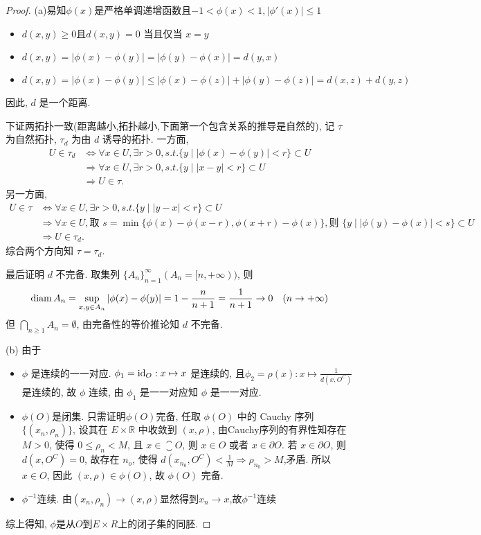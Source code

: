 \begin{proof}
    (a)易知$\phi (x)$是严格单调递增函数且$-1<\phi(x)<1,|\phi '(x)|\leq 1$
    \begin{itemize}
    \item $d(x,y)\geq 0$且$d(x,y)=0$ 当且仅当 $x=y$
    \item $d(x,y)=|\phi(x)-\phi(y)|=|\phi(y)-\phi(x)|=d(y,x)$
    \item $d(x,y)=|\phi(x)-\phi(y)|\leq |\phi(x)-\phi(z)|+|\phi(y)-\phi(z)|=d(x,z)+d(y,z)$
    \end{itemize}
    因此, $d$ 是一个距离.

    下证两拓扑一致(距离越小,拓扑越小,下面第一个包含关系的推导是自然的), 
    记 $\tau$ 为自然拓扑, $\tau_d$ 为由 $d$ 诱导的拓扑. 一方面,
    \begin{align*}
        U\in\tau_d
        & \Leftrightarrow\forall x\in U,\exists r>0,s.t.\{y\mid|\phi(x)-\phi(y)|<r\}\subset U\\
        & \Rightarrow\forall x\in U,\exists r>0,s.t.\{y\mid|x-y|<r\}\subset U\\
        & \Rightarrow U\in\tau.
    \end{align*}
    另一方面,
    \begin{align*}
    U\in\tau
    & \Leftrightarrow\forall x\in U,\exists r>0,s.t.\{y\mid |y-x|<r\}\subset U\\
    & \Rightarrow\forall x\in U,\text{取\ }s=\min\{\phi(x)-\phi(x-r),\phi(x+r)-\phi(x)\},\text{则\ }\{y\mid |\phi(y)-\phi(x)|<s\}\subset U\\
    & \Rightarrow U\in\tau_d.
    \end{align*}
    综合两个方向知 $\tau=\tau_d$.

    最后证明 $d$ 不完备. 取集列 $\{A_n\}_{n=1}^{\infty}(A_n=[n,+\infty))$, 则
    \[\operatorname{diam} A_n=\sup_{x,y\in A_n}|\phi(x)-\phi(y)|=1-\frac{n}{n+1}=\frac{1}{n+1}\to 0\quad(n\to +\infty)\]
    但 $\bigcap\limits_{n\geq 1}A_n=\emptyset$, 由完备性的等价推论知 $d$ 不完备.

    (b) 由于
    \begin{itemize}
    \item $\phi$ 是连续的一一对应. $\phi_1=\mathrm{id}_O:x\mapsto x$ 是连续的, 且$\phi_2=\rho(x):x\mapsto\frac{1}{d(x,O^C)}$是连续的,
          故 $\phi$ 连续, 由 $\phi_1$ 是一一对应知 $\phi$ 是一一对应.
    \item $\phi(O)$是闭集. 只需证明$\phi(O)$完备,
          任取 $\phi(O)$ 中的 Cauchy 序列 $\{(x_n,\rho_n)\}$,
          设其在 $E\times\mathbb{R}$ 中收敛到 $(x,\rho)$,
          由Cauchy序列的有界性知存在 $M>0$, 使得 $0\leq\rho_n<M$, 且 $x\in\closure{O}$, 则 $x\in O$ 或者 $x\in\partial O$.
          若 $x\in\partial O$, 则 $d(x,O^C)=0$, 故存在 $n_o$, 使得 $d(x_{n_0},O^C)<\frac{1}{M}\Rightarrow\rho_{n_0}>M$,矛盾.
          所以 $x\in O$, 因此 $(x,\rho)\in\phi(O)$, 故 $\phi(O)$ 完备.
    \item $\phi^{-1}$连续. 由$(x_n,\rho_n)\rightarrow (x,\rho)$显然得到$x_n\rightarrow x$,故$\phi^{-1}$连续
    \end{itemize}
    综上得知, $\phi$是从$O$到$E\times R$上的闭子集的同胚.


\end{proof}
